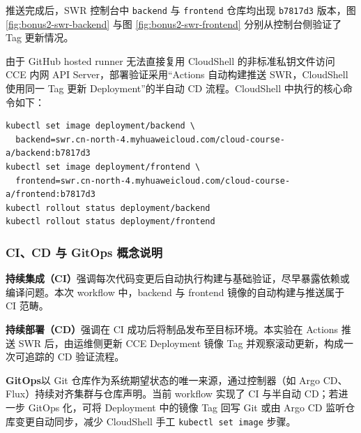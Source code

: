 
推送完成后，SWR 控制台中 \verb|backend| 与 \verb|frontend| 仓库均出现 \verb|b7817d3| 版本，图 \ref{fig:bonus2-swr-backend} 与图 \ref{fig:bonus2-swr-frontend} 分别从控制台侧验证了 Tag 更新情况。



由于 GitHub hosted runner 无法直接复用 CloudShell 的非标准私钥文件访问 CCE 内网 API Server，部署验证采用“Actions 自动构建推送 SWR，CloudShell 使用同一 Tag 更新 Deployment”的半自动 CD 流程。CloudShell 中执行的核心命令如下：

\begin{lstlisting}[caption={CloudShell 更新 Deployment 镜像 Tag（本次验收）}, label=lst:cicd-kubectl]
kubectl set image deployment/backend \
  backend=swr.cn-north-4.myhuaweicloud.com/cloud-course-a/backend:b7817d3
kubectl set image deployment/frontend \
  frontend=swr.cn-north-4.myhuaweicloud.com/cloud-course-a/frontend:b7817d3
kubectl rollout status deployment/backend
kubectl rollout status deployment/frontend
\end{lstlisting}

\subsubsection{CI、CD 与 GitOps 概念说明}

\textbf{持续集成（CI）}强调每次代码变更后自动执行构建与基础验证，尽早暴露依赖或编译问题。本次 workflow 中，backend 与 frontend 镜像的自动构建与推送属于 CI 范畴。

\textbf{持续部署（CD）}强调在 CI 成功后将制品发布至目标环境。本实验在 Actions 推送 SWR 后，由运维侧更新 CCE Deployment 镜像 Tag 并观察滚动更新，构成一次可追踪的 CD 验证流程。

\textbf{GitOps}以 Git 仓库作为系统期望状态的唯一来源，通过控制器（如 Argo CD、Flux）持续对齐集群与仓库声明。当前 workflow 实现了 CI 与半自动 CD；若进一步 GitOps 化，可将 Deployment 中的镜像 Tag 回写 Git 或由 Argo CD 监听仓库变更自动同步，减少 CloudShell 手工 \verb|kubectl set image| 步骤。


